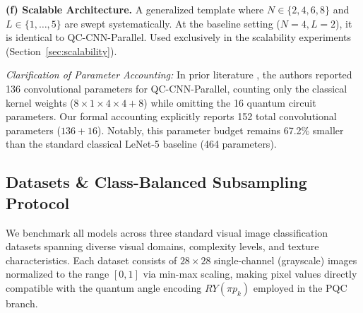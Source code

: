 \documentclass[pdflatex,sn-mathphys-num]{sn-jnl}%
\theoremstyle{thmstyleone}%
\theoremstyle{thmstyletwo}%
\theoremstyle{thmstylethree}%
\begin{document}
\textbf{(f) Scalable Architecture.} A generalized template where $N \in \{2, 4, 6, 8\}$ and $L \in \{1, \dots, 5\}$ are swept systematically. At the baseline setting ($N=4, L=2$), it is identical to QC-CNN-Parallel. Used exclusively in the scalability experiments (Section~\ref{sec:scalability}).

\begin{table}[htbp]
\centering
\caption{Comprehensive Parameter Accounting and Architectural Specifications Across the Extended Model Suite}
\label{tab:param_accounting}
\renewcommand{\arraystretch}{1.1}
\end{table}

\textit{Clarification of Parameter Accounting:} In prior literature \cite{liu2026parallel}, the authors reported 136 convolutional parameters for QC-CNN-Parallel, counting only the classical kernel weights ($8 \times 1 \times 4 \times 4 + 8$) while omitting the 16 quantum circuit parameters. Our formal accounting explicitly reports 152 total convolutional parameters ($136 + 16$). Notably, this parameter budget remains 67.2\% smaller than the standard classical LeNet-5 baseline (464 parameters).

\subsection{Datasets \& Class-Balanced Subsampling Protocol}
We benchmark all models across three standard visual image classification datasets spanning diverse visual domains, complexity levels, and texture characteristics. Each dataset consists of $28 \times 28$ single-channel (grayscale) images normalized to the range $[0, 1]$ via min-max scaling, making pixel values directly compatible with the quantum angle encoding $RY(\pi p_k)$ employed in the PQC branch.
\end{document}
